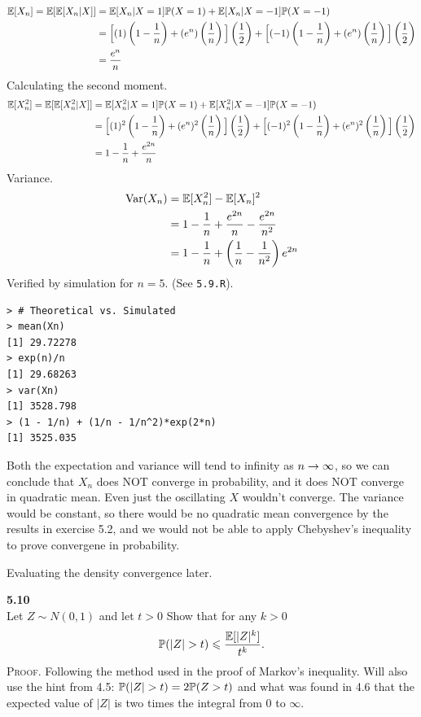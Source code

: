 \newpage\noindent
\begin{align*}
    \E[X_n] = \E[\E[X_n|X]] &=
    \E[X_n|X=1]\P(X=1) + \E[X_n|X=-1]\P(X=-1) \\
    &= \Big[(1)\left(1 - \frac{1}{n}\right) + (e^n)\left(\frac{1}{n}\right)\Big]\left(\frac{1}{2}\right)
    +
    \Big[(-1)\left(1 - \frac{1}{n}\right) + (e^n)\left(\frac{1}{n}\right)\Big]\left(\frac{1}{2}\right) \\
    &= \frac{e^n}{n}
\end{align*}
Calculating the second moment.
\begin{align*}
    \E[X_n^2] = \E[\E[X_n^2|X]] &=
    \E[X_n^2|X=1]\P(X=1) + \E[X_n^2|X=-1]\P(X=-1) \\
    &= \Big[(1)^2\left(1 - \frac{1}{n}\right) + (e^n)^2\left(\frac{1}{n}\right)\Big]\left(\frac{1}{2}\right)
    +
    \Big[(-1)^2\left(1 - \frac{1}{n}\right) + (e^n)^2\left(\frac{1}{n}\right)\Big]\left(\frac{1}{2}\right) \\
    &= 1 - \frac{1}{n} + \frac{e^{2n}}{n}
\end{align*}
Variance.
\begin{align*}
    \V(X_n) &= \E[X_n^2] - \E[X_n]^2 \\
    &= 1 - \frac{1}{n} + \frac{e^{2n}}{n} - \frac{e^{2n}}{n^2} \\
    &= 1 - \frac{1}{n} + \left(\frac{1}{n} - \frac{1}{n^2}\right)e^{2n}
\end{align*}
Verified by simulation for $n=5$. (See \texttt{5.9.R}).
\begin{lstlisting}[style=RSyntax, title=R]
> # Theoretical vs. Simulated
> mean(Xn)
[1] 29.72278
> exp(n)/n
[1] 29.68263
> var(Xn)
[1] 3528.798
> (1 - 1/n) + (1/n - 1/n^2)*exp(2*n)
[1] 3525.035
\end{lstlisting}
Both the expectation and variance will tend to infinity as $n\ra\infty$, so we can conclude
that $X_n$ does NOT converge in probability, and it does NOT converge in quadratic mean.
Even just the oscillating $X$ wouldn't converge. The variance would be constant, so there
would be no quadratic mean convergence by the results in exercise 5.2, and we would not
be able to apply Chebyshev's inequality to prove convergene in probability.

Evaluating the density convergence later.



\newpage\noindent
\textbf{5.10}\\  %
Let $Z\sim N(0,1)$ and let $t>0$ Show that for any $k>0$
$$
\P(|Z| > t) \leq \frac{\E[|Z|^k]}{t^k}.
$$
\textsc{Proof}. Following the method used in the proof of Markov's inequality.
Will also use the hint from 4.5: $\P(|Z| > t) = 2\P(Z > t)$ and what was found
in 4.6 that the expected value of $|Z|$ is two times the integral from 0 to $\infty$.

